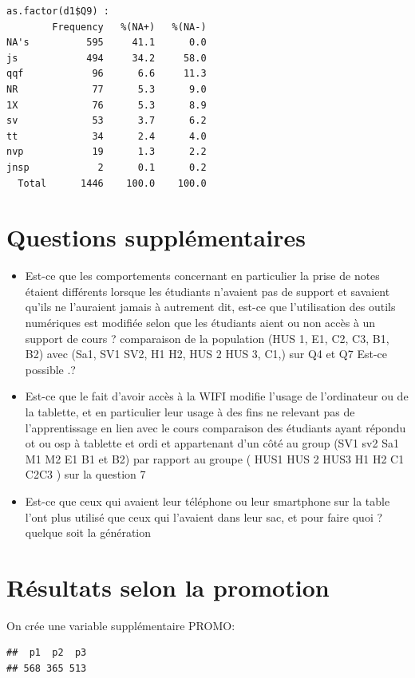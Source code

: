 \documentclass[]{article}
\begin{document}
\begin{verbatim}
as.factor(d1$Q9) : 
        Frequency   %(NA+)   %(NA-)
NA's          595     41.1      0.0
js            494     34.2     58.0
qqf            96      6.6     11.3
NR             77      5.3      9.0
1X             76      5.3      8.9
sv             53      3.7      6.2
tt             34      2.4      4.0
nvp            19      1.3      2.2
jnsp            2      0.1      0.2
  Total      1446    100.0    100.0
\end{verbatim}

\section{Questions supplémentaires}\label{questions-supplementaires}

\begin{itemize}
\item
  Est-ce que les comportements concernant en particulier la prise de
  notes étaient différents lorsque les étudiants n'avaient pas de
  support et savaient qu'ils ne l'auraient jamais à autrement dit,
  est-ce que l'utilisation des outils numériques est modifiée selon que
  les étudiants aient ou non accès à un support de cours ? comparaison
  de la population (HUS 1, E1, C2, C3, B1, B2) avec (Sa1, SV1 SV2, H1
  H2, HUS 2 HUS 3, C1,) sur Q4 et Q7 Est-ce possible .?
\item
  Est-ce que le fait d'avoir accès à la WIFI modifie l'usage de
  l'ordinateur ou de la tablette, et en particulier leur usage à des
  fins ne relevant pas de l'apprentissage en lien avec le cours
  comparaison des étudiants ayant répondu ot ou osp à tablette et ordi
  et appartenant d'un côté au group (SV1 sv2 Sa1 M1 M2 E1 B1 et B2) par
  rapport au groupe ( HUS1 HUS 2 HUS3 H1 H2 C1 C2C3 ) sur la question 7
\item
  Est-ce que ceux qui avaient leur téléphone ou leur smartphone sur la
  table l'ont plus utilisé que ceux qui l'avaient dans leur sac, et pour
  faire quoi ? quelque soit la génération
\end{itemize}

\section{Résultats selon la
promotion}\label{resultats-selon-la-promotion}

On crée une variable supplémentaire PROMO:

\begin{verbatim}
##  p1  p2  p3 
## 568 365 513
\end{verbatim}
\end{document}
